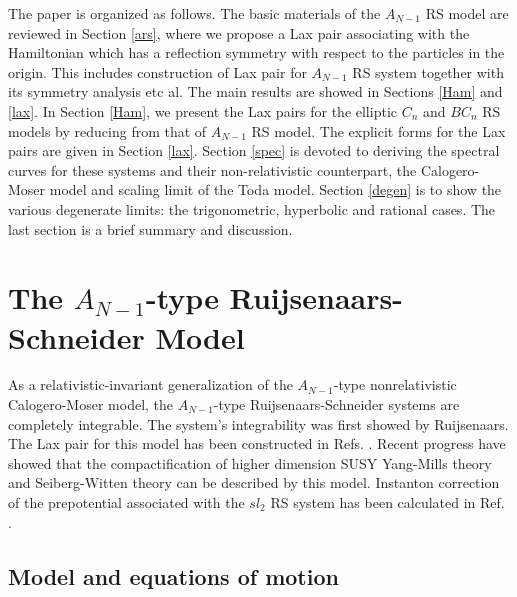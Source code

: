 \documentclass[a4paper,12pt]{article}
\begin{document}
The paper is organized as follows. The basic materials of
the $A_{N-1}$ RS model are reviewed in Section \ref{ars},
where we propose a Lax pair associating with the Hamiltonian
which has a reflection symmetry with respect to the
particles in the origin. This includes construction of Lax
pair for $A_{N-1}$ RS system together with its symmetry
analysis etc al. The main results are showed in Sections
\ref{Ham} and \ref{lax}. In Section \ref {Ham}, we present
the Lax pairs for the elliptic $C_{n}$ and $BC_{n}$ RS
models by reducing from that of $A_{N-1}$ RS model. The
explicit forms for the Lax pairs are given in Section
\ref{lax}. Section \ref{spec} is devoted to deriving the
spectral curves for these systems and their non-relativistic
counterpart, the Calogero-Moser model and scaling limit of
the Toda model. Section \ref{degen} is to show the various
degenerate limits: the trigonometric, hyperbolic and
rational cases. The last section is a brief summary and
discussion.

\section{The $A_{N-1}$-type Ruijsenaars-Schneider Model}

\setcounter{equation}{0} \label{ars}
As a relativistic-invariant
generalization of the $A_{N-1}$-type nonrelativistic
Calogero-Moser model, the $A_{N-1}$-type
Ruijsenaars-Schneider systems are completely integrable. The
system's integrability was first showed by
Ruijsenaars\cite{r1,r2}. The Lax pair for this model has
been constructed in Refs. \cite{r1,nksr,bc,kz,s1,s2}. Recent progress have showed that the
compactification of higher dimension SUSY Yang-Mills theory
and Seiberg-Witten theory can be described by this
model\cite{bm1}. Instanton correction of the prepotential
associated with the $sl_{2}$ RS system has been calculated
in Ref. \cite {ohta}.

\subsection{Model and equations of motion}
\end{document}
